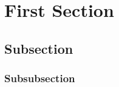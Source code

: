 \section{First Section}\label{sec:first-section}

\subsection{Subsection}\label{subsec:subsection}
\lipsum[1]

\subsubsection{Subsubsection}\label{subsubsec:subsubsection}
\lipsum[1]
